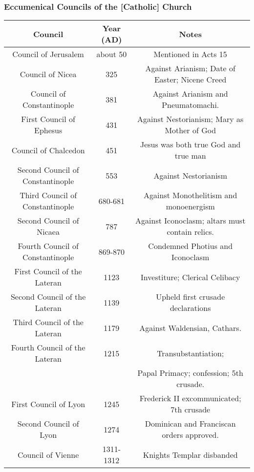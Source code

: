 			\subsubsection{Eccumenical Councils of the [Catholic] Church}
				\begin{tabular}{|c|c|c|}
					\hline
					\textbf{Council} & \textbf{Year (AD)} & \textbf{Notes} \\
					\hline
					Council of Jerusalem & about 50 & Mentioned in Acts 15 \\
					\hline
					Council of Nicea & 325 & Against Arianism; Date of Easter; Nicene Creed \\
					\hline
					Council of Constantinople & 381& Against Arianism and Pneumatomachi. \\
					\hline
					First Council of Ephesus & 431 & Against Nestorianism; Mary as Mother of God \\
					\hline
					Council of Chalcedon & 451 & Jesus was both true God and true man \\
					\hline 
					Second Council of Constantinople & 553&  Against Nestorianism\\
					\hline
					Third Council of Constantinople  & 680-681&  Against Monothelitism and monoenergism \\ 
					\hline
					Second Council of Nicaea & 787 & Against Iconoclasm; altars must contain relics.\\
					\hline
					Fourth Council of Constantinople & 869-870 & Condemned Photius and Iconoclasm \\
					\hline 
					First Council of the Lateran & 1123 & Investiture; Clerical Celibacy \\
					\hline
					Second Council of the Lateran & 1139 & Upheld first crusade declarations \\
					\hline
					Third Council of the Lateran & 1179 & Against Waldensian, Cathars.  \\
					\hline
					Fourth Council of the Lateran & 1215 & Transubstantiation; \\
					 & & Papal  Primacy; confession; 5th crusade. \\
					 \hline
					 First Council of Lyon & 1245 & Frederick II excommunicated; 7th crusade \\ 
					 \hline
					 Second Council of Lyon & 1274 & Dominican and Franciscan orders approved.\\
					 \hline
					 Council of Vienne & 1311-1312 & Knights Templar disbanded \\
					 \hline

\end{tabular}
